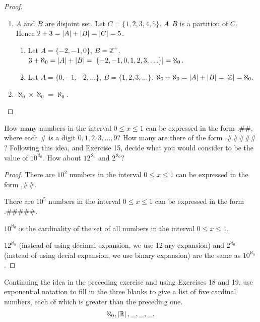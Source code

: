 \begin{proof}
    \begin{enumerate}[label={\textbf{\alph*.}}]
        \item $A$ and $B$ are disjoint set. Let $C = \{ 1, 2, 3, 4, 5 \}$. $A, B$ is a partition of $C$. Hence $2 + 3 = \left\vert{A}\right\vert + \left\vert{B}\right\vert = \left\vert{C}\right\vert = 5$.
              \begin{enumerate}[label={\roman*.}]
                  \item Let $A = \{ -2, -1, 0 \}$, $B = \mathbb{Z}^{+}$. $3 + \aleph_{0} = \left\vert{A}\right\vert + \left\vert{B}\right\vert = \left\vert{\{ -2, -1, 0, 1, 2, 3,\ldots \}}\right\vert = \aleph_{0}$.
                  \item Let $A = \{ 0, -1, -2,\ldots \}$, $B = \{ 1, 2, 3, \ldots \}$. $\aleph_{0} + \aleph_{0} = \left\vert{A}\right\vert + \left\vert{B}\right\vert = \left\vert{\mathbb{Z}}\right\vert = \aleph_{0}$.
              \end{enumerate}
        \item $\aleph_{0}\times\aleph_{0} = \aleph_{0}$.
    \end{enumerate}
\end{proof}

\newpage
\begin{exercise}
    How many numbers in the interval $0\le x\le 1$ can be expressed in the form $.\#\#$, where each $\#$ is a digit $0, 1, 2, 3,\ldots, 9$? How many are there of the form $.\#\#\#\#\#$? Following this idea, and Exercise 15, decide what you would consider to be the value of $10^{\aleph_{0}}$. How about $12^{\aleph_{0}}$ and $2^{\aleph_{0}}$?
\end{exercise}

\begin{proof}
    There are $10^{2}$ numbers in the interval $0\le x\le 1$ can be expressed in the form $.\#\#$.

    There are $10^{5}$ numbers in the interval $0\le x\le 1$ can be expressed in the form $.\#\#\#\#\#$.

    $10^{\aleph_{0}}$ is the cardinality of the set of all numbers in the interval $0\le x\le 1$.

    $12^{\aleph_{0}}$ (instead of using decimal expansion, we use 12-ary expansion) and $2^{\aleph_{0}}$ (instead of using decial expansion, we use binary expansion) are the same as $10^{\aleph_{0}}$.
\end{proof}

\newpage
\begin{exercise}
    Continuing the idea in the preceding exercise and using Exercises 18 and 19, use exponential notation to fill in the three blanks to give a list of five cardinal numbers, each of which is greater than the preceding one.
    \[
        \aleph_{0}, \left\vert{\mathbb{R}}\right\vert, \_, \_, \_.
    \]
\end{exercise}

